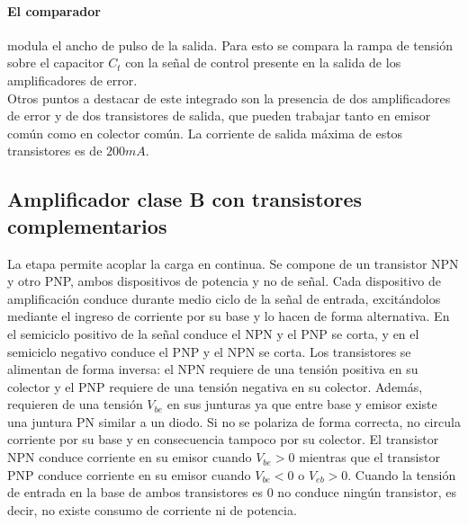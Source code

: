 \paragraph{El comparador} modula el ancho de pulso de la salida.
Para esto se compara la rampa de tensión sobre el capacitor $C_t$ con la señal de control
presente en la salida de los amplificadores de error.\\

Otros puntos a destacar de este integrado son la presencia de dos amplificadores de error y de dos transistores de salida,
que pueden trabajar tanto en emisor común como en colector común. La corriente de salida máxima de estos transistores es de $200mA.$





\subsection{Amplificador clase B con transistores complementarios}

La etapa permite acoplar la carga en continua. 
Se compone de un transistor NPN y otro PNP, ambos dispositivos de potencia y no de señal. 
Cada dispositivo de amplificación conduce durante medio ciclo de la señal de entrada, 
excitándolos mediante el ingreso de corriente por su base y lo hacen de forma alternativa. 
En el semiciclo positivo de la señal conduce el NPN y el PNP se corta, y en el semiciclo negativo conduce el PNP y el NPN se corta. 
Los transistores se alimentan de forma inversa: el NPN requiere de una tensión positiva en su colector y el PNP requiere de una tensión negativa en su colector.
Además, requieren de una tensión $V_{be}$ en sus junturas ya que entre base y emisor existe una juntura PN similar a un diodo. 
Si no se polariza de forma correcta, no circula corriente por su base y en consecuencia tampoco por su colector. 
El transistor NPN conduce corriente en su emisor cuando $V_{be}>0$ mientras que el transistor PNP conduce corriente en su emisor cuando $V_{be}<0$ o $V_{eb}>0$.
Cuando la tensión de entrada en la base de ambos transistores es 0 no conduce ningún transistor, es decir, no existe consumo de corriente ni de potencia. 

